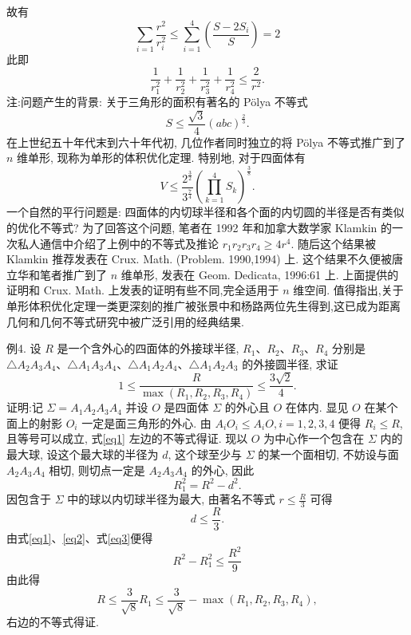 故有
$$
\sum_{i=1} \frac{r^2}{r_i^2} \leqslant \sum_{i=1}^4\left(\frac{S-2 S_i}{S}\right)=2
$$
此即
$$
\frac{1}{r_1^2}+\frac{1}{r_2^2}+\frac{1}{r_3^2}+\frac{1}{r_4^2} \leqslant \frac{2}{r^2} .
$$
注:问题产生的背景: 关于三角形的面积有著名的 Pölya 不等式
$$
S \leqslant \frac{\sqrt{3}}{4}(a b c)^{\frac{2}{3}} .
$$
在上世纪五十年代末到六十年代初, 几位作者同时独立的将 Pölya 不等式推广到了 $n$ 维单形, 现称为单形的体积优化定理.
特别地, 对于四面体有
$$
V \leqslant \frac{2^{\frac{3}{2}}}{3^{\frac{7}{4}}}\left(\prod_{k=1}^4 S_k\right)^{\frac{3}{8}} .
$$
一个自然的平行问题是: 四面体的内切球半径和各个面的内切圆的半径是否有类似的优化不等式?
为了回答这个问题, 笔者在 1992 年和加拿大数学家 Klamkin 的一次私人通信中介绍了上例中的不等式及推论 $r_1 r_2 r_3 r_4 \geqslant 4 r^4$. 随后这个结果被 Klamkin 推荐发表在 Crux. Math. (Problem. 1990,1994) 上.
这个结果不久便被唐立华和笔者推广到了 $n$ 维单形, 发表在 Geom. Dedicata, 1996:61 上.
上面提供的证明和 Crux. Math. 上发表的证明有些不同,完全适用于 $n$ 维空间.
值得指出,关于单形体积优化定理一类更深刻的推广被张景中和杨路两位先生得到,这已成为距离几何和几何不等式研究中被广泛引用的经典结果.



例4. 设 $R$ 是一个含外心的四面体的外接球半径, $R_1 、 R_2 、 R_3 、 R_4$ 分别是 $\triangle A_2 A_3 A_4 、 \triangle A_1 A_3 A_4 、 \triangle A_1 A_2 A_4 、 \triangle A_1 A_2 A_3$ 的外接圆半径, 求证
$$
1 \leqslant \frac{R}{\max \left(R_1, R_2, R_3, R_4\right)} \leqslant \frac{3 \sqrt{2}}{4} . \label{eq1}
$$
证明:记 $\Sigma=A_1 A_2 A_3 A_4$ 并设 $O$ 是四面体 $\Sigma$ 的外心且 $O$ 在体内.
显见 $O$ 在某个面上的射影 $O_i$ 一定是面三角形的外心.
由 $A_i O_i \leqslant A_i O, i=1,2,3,4$ 便得 $R_i \leqslant R$,且等号可以成立, 式\ref{eq1} 左边的不等式得证.
现以 $O$ 为中心作一个包含在 $\Sigma$ 内的最大球, 设这个最大球的半径为 $d$, 这个球至少与 $\Sigma$ 的某一个面相切, 不妨设与面 $A_2 A_3 A_4$ 相切, 则切点一定是 $A_2 A_3 A_4$ 的外心, 因此
$$
R_1^2=R^2-d^2 . \label{eq2}
$$
因包含于 $\Sigma$ 中的球以内切球半径为最大, 由著名不等式 $r \leqslant \frac{R}{3}$ 可得
$$
d \leqslant \frac{R}{3}. \label{eq3}
$$
由式\ref{eq1}、\ref{eq2}、式\ref{eq3}便得
$$
R^2-R_1^2 \leqslant \frac{R^2}{9}
$$
由此得
$$
R \leqslant \frac{3}{\sqrt{8}} R_1 \leqslant \frac{3}{\sqrt{8}}-\max \left(R_1, R_2, R_3, R_4\right),
$$
右边的不等式得证.




